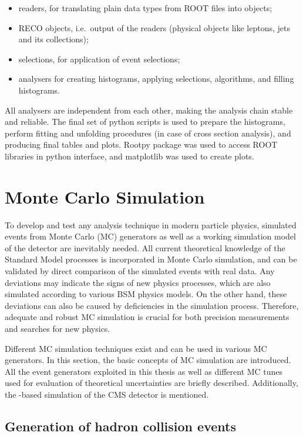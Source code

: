 \begin{itemize}
  \item readers, for translating plain data types from ROOT files into \Cplusplus objects;
  \item RECO objects, i.e.\ output of the readers (physical objects like leptons, jets and its collections);
  \item selections, for application of event selections;
  \item analysers for creating histograms, applying selections, algorithms, and filling histograms.
\end{itemize}

All analysers are independent from each other, making the analysis chain stable and reliable. The final set of python
scripts is used to prepare the histograms, perform fitting and unfolding procedures (in case of cross section analysis),
and producing final tables and plots. Rootpy package \autocite{rootpy} was used to access ROOT libraries in python
interface, and matplotlib \autocite{matplotlib} was used to create plots.

\section{Monte Carlo Simulation}
\label{s:MC_simulation}
To develop and test any analysis technique in modern particle physics, simulated events from Monte Carlo (MC) generators
as well as a working simulation model of the detector are inevitably needed. All current theoretical knowledge of the
Standard Model processes is incorporated in Monte Carlo simulation, and can be validated by direct comparison of the
simulated events with real data. Any deviations may indicate the signs of new physics processes, which are also
simulated according to various BSM physics models. On the other hand, these deviations can also be caused by
deficiencies in the simulation process. Therefore, adequate and robust MC simulation is crucial for both precision
measurements and searches for new physics.

Different MC simulation techniques exist and can be used in various MC generators. In this section, the basic concepts
of MC simulation are introduced. All the event generators exploited in this thesis as well as different MC tunes used
for evaluation of theoretical uncertainties are briefly described. Additionally, the \GEANTfour-based
\autocite{GEANT4} simulation of the CMS detector is mentioned.

\subsection{Generation of hadron collision events}
\label{ss:hadron_collisions_simulation}

